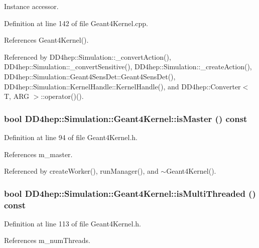 Instance accessor. 

Definition at line 142 of file Geant4Kernel.cpp.

References Geant4Kernel().

Referenced by DD4hep::Simulation::\_\-convertAction(), DD4hep::Simulation::\_\-convertSensitive(), DD4hep::Simulation::\_\-createAction(), DD4hep::Simulation::Geant4SensDet::Geant4SensDet(), DD4hep::Simulation::KernelHandle::KernelHandle(), and DD4hep::Converter$<$ T, ARG $>$::operator()().\hypertarget{class_d_d4hep_1_1_simulation_1_1_geant4_kernel_ad6a2eb75792e2420a3e1e0fb45222d50}{
\subsubsection[{isMaster}]{\setlength{\rightskip}{0pt plus 5cm}bool DD4hep::Simulation::Geant4Kernel::isMaster () const}}
\label{class_d_d4hep_1_1_simulation_1_1_geant4_kernel_ad6a2eb75792e2420a3e1e0fb45222d50}


Definition at line 94 of file Geant4Kernel.h.

References m\_\-master.

Referenced by createWorker(), runManager(), and $\sim$Geant4Kernel().\hypertarget{class_d_d4hep_1_1_simulation_1_1_geant4_kernel_a053a94be9966b7851bf25fdafb9a9d01}{
\subsubsection[{isMultiThreaded}]{\setlength{\rightskip}{0pt plus 5cm}bool DD4hep::Simulation::Geant4Kernel::isMultiThreaded () const}}
\label{class_d_d4hep_1_1_simulation_1_1_geant4_kernel_a053a94be9966b7851bf25fdafb9a9d01}


Definition at line 113 of file Geant4Kernel.h.

References m\_\-numThreads.

